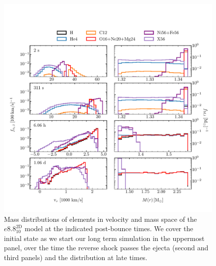 \documentclass[fleqn,usenatbib]{mnras}
\begin{document}
\begin{figure}
 \centering
 \includegraphics[width=\textwidth,trim=0cm 0.6cm 0cm 1cm, clip]{pic/e8_2d_10_massDis_mvr_mas_4times_paper.pdf}
 \caption{Mass distributions of elements in velocity and mass space  of the $e8.8^{\mathrm{2D}}_{10}$ model at the indicated post-bounce times. We cover the initial state as we start our long term simulation in the uppermost panel, over the time the reverse shock passes the ejecta (second and third panels) and the distribution at late times.}
 \label{fig:e8 massDis 4times}
\end{figure}

%
\end{document}
